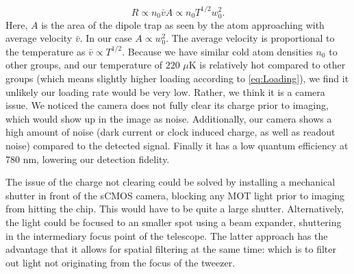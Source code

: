 \begin{equation}\label{eq:Loading}
    R \propto n_0 \bar{v} A\propto n_0 T^{1/2} w_0^2.
\end{equation}
Here, $A$ is the area of the dipole trap as seen by the atom approaching with average velocity $\bar{v}$. 
In our case $A \propto w_0^2$.
The average velocity is proportional to the temperature as $\bar{v}\propto T^{1/2}$.
Because we have similar cold atom densities $n_0$ to other groups, and our temperature of $220$ $\mu$K is relatively hot compared to other groups (which means slightly higher loading according to \cref{eq:Loading}), we find it unlikely our loading rate would be very low. 
Rather, we think it is a camera issue. 
We noticed the camera does not fully clear its charge prior to imaging, which would show up in the image as noise. 
Additionally, our camera shows a high amount of noise (dark current or clock induced charge, as well as readout noise) compared to the detected signal.
Finally it has a low quantum efficiency at 780 nm, lowering our detection fidelity. 

The issue of the charge not clearing could be solved by installing a mechanical shutter in front of the sCMOS camera, blocking any MOT light prior to imaging from hitting the chip. 
This would have to be quite a large shutter.
Alternatively, the light could be focused to an smaller spot using a beam expander, shuttering in the intermediary focus point of the telescope. 
The latter approach has the advantage that it allows for spatial filtering at the same time: which is to filter out light not originating from the focus of the tweezer. 
 

